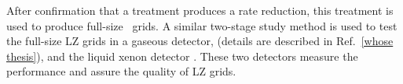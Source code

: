 After confirmation that a treatment produces a rate reduction,  this treatment is used to produce full-size \lze\ grids. A similar two-stage study method is used to test the full-size LZ grids in a gaseous detector, \phasetwo(details are described in Ref.~\ref{whose thesis}), and the liquid xenon detector \lze . These two detectors measure the performance and assure the quality of LZ grids.






